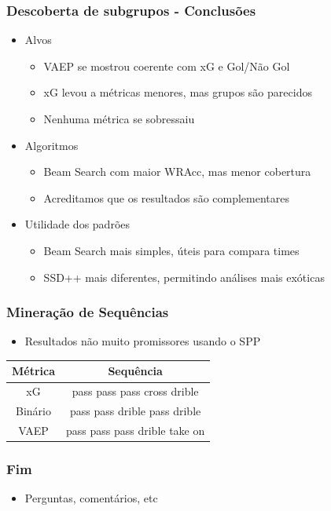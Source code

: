 \documentclass{beamer}
\begin{document}
\begin{frame}
\frametitle{Descoberta de subgrupos - Conclusões}
\begin{itemize}
    \item Alvos
    \begin{itemize}
        \item VAEP se mostrou coerente com xG e Gol/Não Gol
        \item xG levou a métricas menores, mas grupos são parecidos
        \item Nenhuma métrica se sobressaiu
    \end{itemize}
    \item Algoritmos
    \begin{itemize}
        \item Beam Search com maior WRAcc, mas menor cobertura
        \item Acreditamos que os resultados são complementares
    \end{itemize}
    \item Utilidade dos padrões
    \begin{itemize}
        \item Beam Search mais simples, úteis para compara times
        \item SSD++ mais diferentes, permitindo análises mais exóticas
    \end{itemize}
\end{itemize}
\end{frame}

\begin{frame}
\frametitle{Mineração de Sequências}
    \begin{itemize}
        \item Resultados não muito promissores usando o SPP
    \end{itemize}
    \begin{center}
        \begin{tabular}{|c|c|}
            \hline
            \textbf{Métrica} & \textbf{Sequência} \\
            \hline
            xG & pass pass pass cross drible  \\
            \hline
            Binário & pass pass drible pass drible \\
            \hline
            VAEP & pass pass pass drible take on \\
            \hline
        \end{tabular}
    \end{center}
\end{frame}

\begin{frame}
\frametitle{Fim}
\begin{itemize}
    \item Perguntas, comentários, etc 
\end{itemize}
\end{frame}
\end{document}
